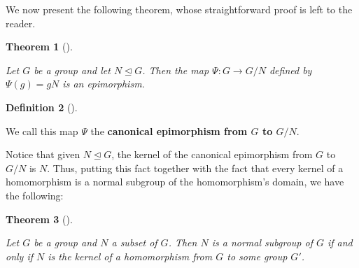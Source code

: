 \documentclass[10pt,]{book}
\newcommand{\terminology}[1]{\textbf{#1}}
\theoremstyle{plain}
\newtheorem{theorem}{Theorem}[section]
\theoremstyle{definition}
\newtheorem{definition}[theorem]{Definition}
\theoremstyle{definition}
\theoremstyle{definition}
\theoremstyle{definition}
\numberwithin{equation}{section}
\begin{document}
    We now present the following theorem, whose straightforward
    proof is left to the reader.
\begin{theorem}[{}]\label{theorem-55}

        Let \(G\) be a group and let \(N\unlhd G\). Then the
        map \(\Psi: G\to G/N\) defined by \(\Psi(g)=gN\) is an epimorphism.
\end{theorem}
\begin{definition}[{}]\label{definition-69}

        We call this map \(\Psi\) the \terminology{canonical epimorphism
        from \(G\) to \(G/N\)}.
\label{notation-75}
\end{definition}
\par

    Notice that given \(N\unlhd G\), the kernel of the canonical
    epimorphism from \(G\) to \(G/N\) is \(N\). Thus, putting this fact
    together with the fact that every kernel of a homomorphism is a
    normal subgroup of the homomorphism's domain, we have the following:
\begin{theorem}[{}]\label{theorem-56}

        Let \(G\) be a group and \(N\) a subset of \(G\). Then \(N\)
        is a normal subgroup of \(G\) if and only if \(N\) is the kernel of a
        homomorphism from \(G\) to some group \(G'\).
\end{theorem}
\typeout{************************************************}
\typeout{************************************************}
\end{document}
